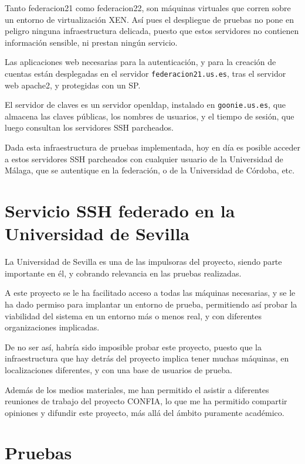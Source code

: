     Tanto federacion21 como federacion22, son máquinas virtuales que corren
    sobre un entorno de virtualización XEN. Así pues el despliegue de
    pruebas no pone en peligro ninguna infraestructura delicada, puesto que
    estos servidores no contienen información sensible, ni prestan ningún
    servicio.

    Las aplicaciones web necesarias para la autenticación, y para la
    creación de cuentas están desplegadas en el servidor
    \texttt{federacion21.us.es}, tras el servidor web apache2, y protegidas
    con un SP.

    El servidor de claves es un servidor openldap, instalado en
    \texttt{goonie.us.es}, que almacena las claves públicas, los nombres de
    usuarios, y el tiempo de sesión, que luego consultan los servidores SSH
    parcheados.

    Dada esta infraestructura de pruebas implementada, hoy en día es posible
    acceder a estos servidores SSH parcheados con cualquier usuario de la
    Universidad de Málaga, que se autentique en la federación, o de la
    Universidad de Córdoba, etc.

\section{Servicio SSH federado en la Universidad de Sevilla}

    La Universidad de Sevilla es una de las impulsoras del proyecto, siendo
    parte importante en él, y cobrando relevancia en las pruebas
    realizadas.

    A este proyecto se le ha facilitado acceso a todas las máquinas
    necesarias, y se le ha dado permiso para implantar un entorno de
    prueba, permitiendo así probar la viabilidad del sistema en un entorno
    más o menos real, y con diferentes organizaciones implicadas.

    De no ser así, habría sido imposible probar este proyecto, puesto que
    la infraestructura que hay detrás del proyecto implica tener muchas
    máquinas, en localizaciones diferentes, y con una base de usuarios de
    prueba.

    Además de los medios materiales, me han permitido el asistir a
    diferentes reuniones de trabajo del proyecto CONFIA, lo que me ha
    permitido compartir opiniones y difundir este proyecto, más allá del
    ámbito puramente académico.

\section{Pruebas}

